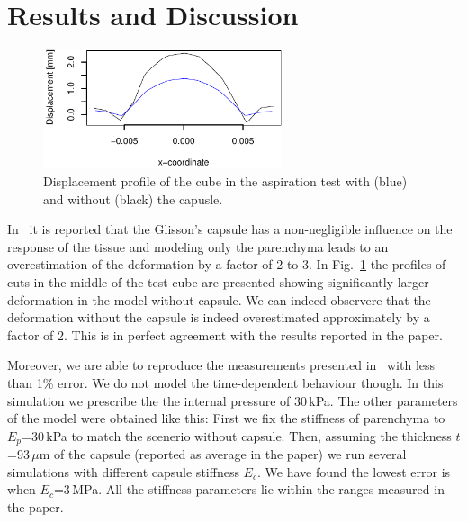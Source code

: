 \documentclass{acm_proc_article-sp}
\newcommand{\TG}[1]{{\color{blue}\textbf{TG: #1}}}
\begin{document}


\section{Results and Discussion} %

\begin{figure}
  \centering
  \includegraphics[width=7cm]{aspiration.pdf}
  \caption{\label{fig-aspiration2} Displacement profile of the cube in the
  aspiration test with (blue) and without (black) the capusle.}
\end{figure}

In~\cite{Hollenstein2006} it is reported that the Glisson's
capsule has a non-negligible influence on the response of the tissue and modeling
only the parenchyma leads to an overestimation of the deformation by a factor of 2 to 3. 
In Fig.~\ref{fig-aspiration2} the profiles of cuts in the middle of the
test cube are presented showing significantly larger deformation in the model without capsule.
We can indeed observere that the deformation without the capsule is indeed overestimated approximately by a factor of 2. This is in perfect agreement with the results reported in the paper.%

Moreover, we are able to reproduce
the measurements presented in~\cite{Hollenstein2006,Nava2008} with less than 1\% error.
We do not model the time-dependent behaviour though.
In this simulation we prescribe the the internal pressure of 30\,kPa. The other
parameters of the model were obtained like this: First we fix the stiffness of
parenchyma to $E_p$=30\,kPa to match the scenerio without capsule. Then,
assuming the thickness $t$=93\,$\mu$m of the capsule (reported as average in
the paper) we run several simulations with different capsule stiffness $E_c$.
We have found the lowest error is when $E_c$=3\,MPa. All the stiffness
parameters lie within the ranges measured in the paper.

\end{document}
